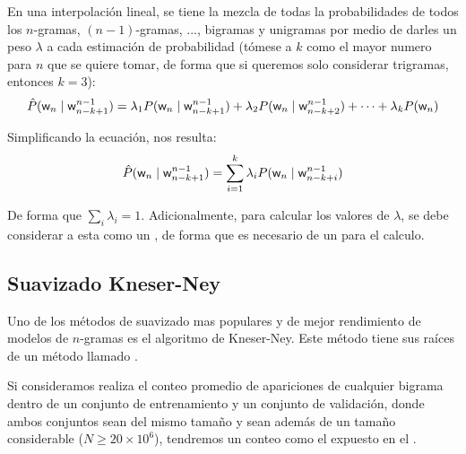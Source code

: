 En una interpolación lineal, se tiene la mezcla de todas la probabilidades de todos los $n$-gramas, $(n-1)$-gramas, ..., bigramas y unigramas por medio de darles un peso $\lambda$ a cada estimación de probabilidad (tómese a $k$ como el mayor numero para $n$ que se quiere tomar, de forma que si queremos solo considerar trigramas, entonces $k=3$):
\begin{equation}
  \hat{P}({\mathit{\mathsf{w}}}_n \mid {\mathit{\mathsf{w}}}_{n-k+1}^{n-1}) = \lambda_1 P({\mathit{\mathsf{w}}}_n \mid {\mathit{\mathsf{w}}}_{n-k+1}^{n-1}) + \lambda_2 P({\mathit{\mathsf{w}}}_n \mid {\mathit{\mathsf{w}}}_{n-k+2}^{n-1}) + \cdots + \lambda_k P({\mathit{\mathsf{w}}}_n)
\end{equation}

Simplificando la ecuación, nos resulta:
\begin{equation}
  \hat{P}({\mathit{\mathsf{w}}}_n \mid {\mathit{\mathsf{w}}}_{n-k+1}^{n-1}) = \sum_{i=1}^{k} \lambda_i P({\mathit{\mathsf{w}}}_n \mid {\mathit{\mathsf{w}}}_{n-k+i}^{n-1})
\end{equation}

De forma que $\sum_i \lambda_i = 1$. Adicionalmente, para calcular los valores de $\lambda$, se debe considerar a esta como un , de forma que es necesario de un  para el calculo.

\subsection{Suavizado Kneser-Ney}
Uno de los métodos de suavizado mas populares y de mejor rendimiento de modelos de $n$-gramas es el algoritmo de Kneser-Ney. Este método tiene sus raíces de un método llamado .

Si consideramos realiza el conteo promedio de apariciones de cualquier bigrama dentro de un conjunto de entrenamiento y un conjunto de validación, donde ambos conjuntos sean del mismo tamaño y sean además de un tamaño considerable ($N \ge 20 \times 10^6$), tendremos un conteo como el expuesto en el .

